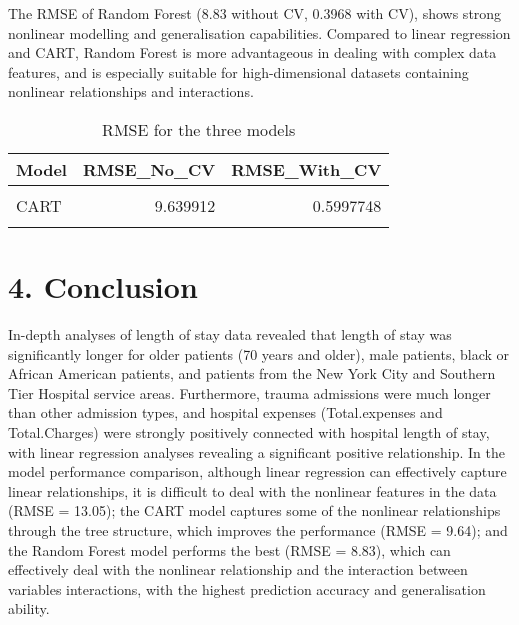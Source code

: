 \documentclass[
  10pt,
]{article}
\begin{document}
The RMSE of Random Forest (8.83 without CV, 0.3968 with CV), shows
strong nonlinear modelling and generalisation capabilities. Compared to
linear regression and CART, Random Forest is more advantageous in
dealing with complex data features, and is especially suitable for
high-dimensional datasets containing nonlinear relationships and
interactions.

\begin{table}
\centering
\caption{\label{tab:unnamed-chunk-6}RMSE for the three models}
\centering
\fontsize{7}{9}\selectfont
\begin{tabular}[t]{lrr}
\toprule
Model & RMSE\_No\_CV & RMSE\_With\_CV\\
\midrule
\cellcolor{gray!10}{Linear Regression} & \cellcolor{gray!10}{13.047861} & \cellcolor{gray!10}{0.4074009}\\
CART & 9.639912 & 0.5997748\\
\cellcolor{gray!10}{Random Forest} & \cellcolor{gray!10}{8.833774} & \cellcolor{gray!10}{0.3968267}\\
\bottomrule
\end{tabular}
\end{table}

\section{4. Conclusion}\label{conclusion}

In-depth analyses of length of stay data revealed that length of stay
was significantly longer for older patients (70 years and older), male
patients, black or African American patients, and patients from the New
York City and Southern Tier Hospital service areas. Furthermore, trauma
admissions were much longer than other admission types, and hospital
expenses (Total.expenses and Total.Charges) were strongly positively
connected with hospital length of stay, with linear regression analyses
revealing a significant positive relationship. In the model performance
comparison, although linear regression can effectively capture linear
relationships, it is difficult to deal with the nonlinear features in
the data (RMSE = 13.05); the CART model captures some of the nonlinear
relationships through the tree structure, which improves the performance
(RMSE = 9.64); and the Random Forest model performs the best (RMSE =
8.83), which can effectively deal with the nonlinear relationship and
the interaction between variables interactions, with the highest
prediction accuracy and generalisation ability.
\end{document}
